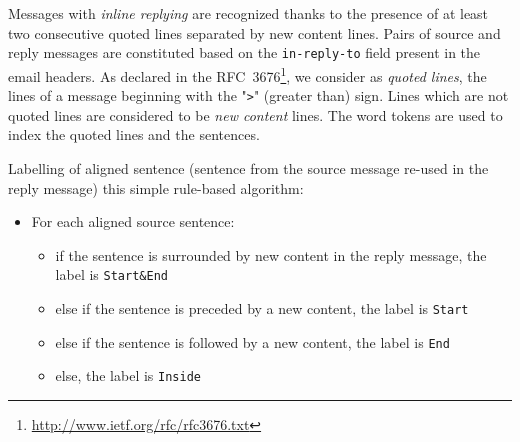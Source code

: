 %
Messages with \textit{inline replying} are recognized thanks to the presence of at least two consecutive quoted lines separated by new content lines. 
Pairs of source and reply messages are constituted based on the \texttt{\footnotesize in-reply-to} field present in the email headers.
 As declared in the RFC~3676\footnote{\url{http://www.ietf.org/rfc/rfc3676.txt}}, we consider as \textit{quoted lines}, the lines of a message beginning with %
 the "\texttt{>}" (greater than) sign.
Lines which are not quoted lines are considered to be \textit{new content} lines.
The word tokens are used to index the quoted lines and the sentences. 


Labelling of aligned sentence (sentence from the source message re-used in the reply message) this simple rule-based algorithm:

\begin{itemize}
\item[] For each aligned source sentence: \vspace{-0.2cm}
\begin{itemize}
\item[] if the sentence is surrounded by new content in the reply message, the label is \texttt{Start\&End}
\item[] else if the sentence is preceded by a new content, the label is \texttt{Start}
\item[] \indent else if the sentence is followed by a new content, the label is \texttt{End}
\item[] else, the label is \texttt{Inside}
\end{itemize}
\end{itemize}

